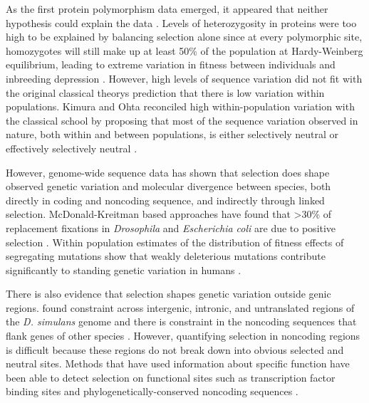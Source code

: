 As the first protein polymorphism  data emerged, it appeared that neither hypothesis could explain the data \citep{Lewontin1966-kz,Harris1966-lm}. Levels of heterozygosity in proteins were too high to be explained by balancing selection alone since at every polymorphic site, homozygotes will still make up at least 50\% of the population at Hardy-Weinberg equilibrium, leading to extreme variation in fitness between individuals and inbreeding depression \citep{lewontin1974}. However, high levels of sequence variation did not fit with the original classical theory\textsc{}s prediction that there is low variation within populations. Kimura and Ohta reconciled high within-population variation with the classical school by proposing that most of the sequence variation observed in nature, both within and between populations, is either selectively neutral or effectively selectively neutral \citep{Kimura1968-cl,Mootoo_Kimura1971-dc,Kimura_undated-by,Ohta1973-qx}.

However, genome-wide sequence data has shown that selection does shape observed genetic variation and molecular divergence between species, both directly in coding and noncoding sequence, and indirectly through linked selection. McDonald-Kreitman based approaches have found that \textgreater 30\% of replacement fixations in \textit{Drosophila} and \textit{Escherichia coli} are due to positive selection \citep{Eyre-Walker2006-jg,Fay2002-au,Begun2007-gh}. Within population estimates of the distribution of fitness effects of segregating mutations show that weakly deleterious mutations contribute significantly to standing genetic variation in humans \citep{Williamson2005-ja,Eyre-Walker2006-tr}. 

There is also evidence that selection shapes genetic variation outside genic regions. \citet{Begun2007-gh} found constraint across intergenic, intronic, and untranslated regions of the \textit{D. simulans} genome and there is constraint in the noncoding sequences that flank genes of other species \citep{Eory2010-ja}. However, quantifying selection in noncoding regions is difficult because these regions do not break down into obvious selected and neutral sites. Methods that have used information about specific function have been able to detect selection on functional sites such as transcription factor binding sites \citep{Arbiza2013-te} and phylogenetically-conserved noncoding sequences \citep{Halligan2013}. 

